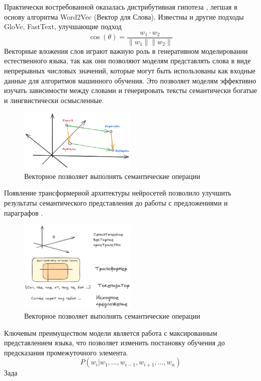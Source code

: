 Практически востребованной оказалась дистрибутивная гипотеза \cite{Schutze},
легшая в основу алгоритма Word2Vec (Вектор для Слова)\cite{NIPS2013_9aa42b31}. 
Известны и другие подходы GloVe, FastText, улучшающие подход
\begin{equation}
    \cos(\theta) = \frac{w_1 \cdot w_2}{\|w_1\| \|w_2\|}
\end{equation}
Векторные вложения слов играют важную роль в генеративном моделировании естественного языка, так как они позволяют моделям представлять слова в виде непрерывных числовых значений, которые могут быть использованы как входные данные для алгоритмов машинного обучения. 
Это позволяет моделям эффективно изучать зависимости между словами и генерировать тексты семантически богатые и лингвистически осмысленные.
\begin{figure}[h]
    \centering
    \includegraphics[width=0.5\textwidth]{assets/ml/nlp/vector.excalidraw.png}
    \caption{Векторное позволяет выполнять семантические операции}
    \label{embedding}
\end{figure}
Появление трансформерной архитектуры нейросетей  позволило улучшить результаты семантического представления до
работы с предложениями и параграфов \cite{devlin2018bert}.
\begin{figure}[h]
    \centering
    \includegraphics[width=0.5\textwidth]{assets/ml/nlp/bert.excalidraw.png}
    \caption{Векторное позволяет выполнять семантические операции}
    \label{embedding}
\end{figure}
Ключевым преимуществом модели является работа с максированным представлением языка, что позволяет изменить постановку обучения 
до предсказания промежуточного элемента.
\begin{equation}
    P(w_i |w_1,\dots,w_{i-1},w_{i+1},\dots, w_n) 
\end{equation}
Зада




